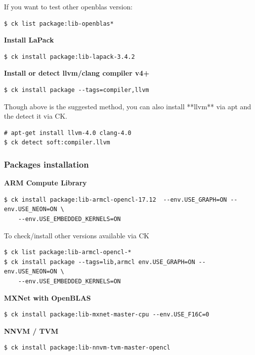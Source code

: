 \documentclass[sigplan]{acmart}
\begin{document}
If you want to test other openblas version:

\begin{verbatim}
$ ck list package:lib-openblas* 
\end{verbatim}

\textbf{Install LaPack}

\begin{verbatim}
$ ck install package:lib-lapack-3.4.2
\end{verbatim}

\textbf{Install or detect llvm/clang compiler v4+}

\begin{verbatim}
$ ck install package --tags=compiler,llvm
\end{verbatim}

Though above is the suggested method, you can also install **llvm** via apt and the detect it via CK.

\begin{verbatim}
# apt-get install llvm-4.0 clang-4.0
$ ck detect soft:compiler.llvm 
\end{verbatim}

\subsubsection{Packages installation}

\textbf{ARM Compute Library}

\begin{verbatim}
$ ck install package:lib-armcl-opencl-17.12  --env.USE_GRAPH=ON --env.USE_NEON=ON \
    --env.USE_EMBEDDED_KERNELS=ON 
\end{verbatim}

To check/install other versions available via CK 

\begin{verbatim}
$ ck list package:lib-armcl-opencl-* 
$ ck install package --tags=lib,armcl env.USE_GRAPH=ON --env.USE_NEON=ON \
    --env.USE_EMBEDDED_KERNELS=ON 
\end{verbatim}

\textbf{MXNet with OpenBLAS}

\begin{verbatim}
$ ck install package:lib-mxnet-master-cpu --env.USE_F16C=0
\end{verbatim}

\textbf{NNVM / TVM}

\begin{verbatim}
$ ck install package:lib-nnvm-tvm-master-opencl 
\end{verbatim}
\end{document}
